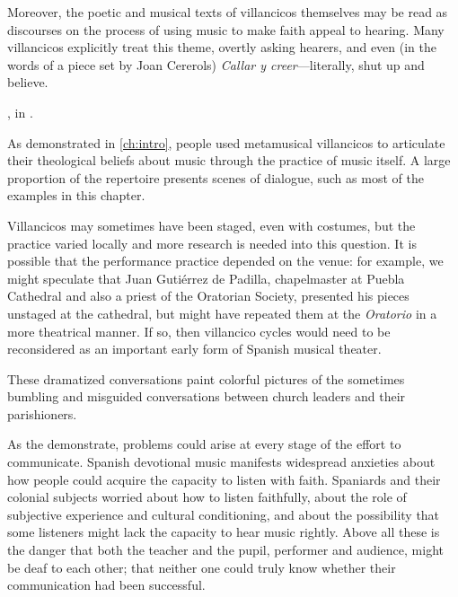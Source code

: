 Moreover, the poetic and musical texts of villancicos themselves may be read as
discourses on the process of using music to make faith appeal to hearing.
Many villancicos explicitly treat this theme, overtly asking hearers,
  and even (in the words of a piece set
by Joan Cererols) \emph{Callar y creer}---literally, shut up and believe.%
    \begin{Footnote}
        , in
        \autocite[205--212]{Cererols:MEM-VC}.
    \end{Footnote}
As demonstrated in \cref{ch:intro}, people used metamusical villancicos to
articulate their theological beliefs about music through the practice of music
itself.
A large proportion of the repertoire presents scenes of dialogue, such as most
of the examples in this chapter.%
\begin{Footnote}
    Villancicos may sometimes have been staged, even with costumes, but the
    practice varied locally and more research is needed into this question.
    It is possible that the performance practice depended on the venue: for
    example, we might speculate that Juan Gutiérrez de Padilla, chapelmaster at
    Puebla Cathedral and also a priest of the Oratorian Society, presented his
    pieces unstaged at the cathedral, but might have repeated them at the
    \emph{Oratorio} in a more theatrical manner.
    If so, then villancico cycles would need to be reconsidered as an important
    early form of Spanish musical theater.
\end{Footnote}
These dramatized conversations paint colorful pictures of the sometimes bumbling
and misguided conversations between church leaders and their parishioners.

As the  demonstrate, problems could arise at
every stage of the effort to communicate.
Spanish devotional music manifests widespread anxieties about how people could
acquire the capacity to listen with faith.
Spaniards and their colonial subjects worried about how to listen faithfully,
about the role of subjective experience and cultural conditioning, and about the
possibility that some listeners might lack the capacity to hear music rightly.
Above all these is the danger that both the teacher and the pupil, performer and
audience, might be deaf to each other; that neither one could truly know whether
their communication had been successful.

